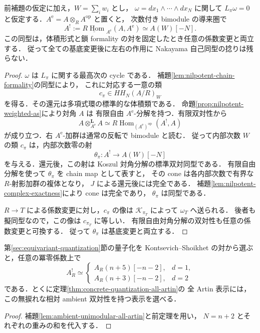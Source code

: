 \begin{theorem}
\label{thm:nilpotent-ambient-cy}
前補題の仮定に加え，$W=\sum_iw_i$ とし，
$\omega=dx_1\wedge\cdots\wedge dx_N$ に関して
$L_\pi\omega=0$ と仮定する．$A^{\mathrm e}=A\otimes_R A^{\mathrm{op}}$ と置くと，
次数付き bimodule の導来圏で
\[
 A^!:=\underline{R\operatorname{Hom}}_{A^{\mathrm e}}(A,A^{\mathrm e})
 \simeq A(W)[-N].
\]
この同型は，体積形式と鎖 formality の対を固定したとき任意の係数変更と両立する．
従って全ての基底変更後に左右の作用に Nakayama 自己同型の捻りは残らない．
\end{theorem}
\begin{proof}
$\omega$ は $L_\pi$ に関する最高次の cycle である．
補題\ref{lem:nilpotent-chain-formality}の同型により，
これに対応する一意の類
\[
 c_\pi\in HH_N(A/R)_W
\]
を得る．その還元は多項式環の標準的な体積類である．
命題\ref{prop:nilpotent-weighted-as}により対角 $A$ は
有限自由 $A^{\mathrm e}$-分解を持つ．有限双対性から
\[
 A\mathbin{\otimes^{\mathbf L}_{A^{\mathrm e}}}A
 \simeq R\operatorname{Hom}_{(A^{\mathrm e})^{\mathrm{op}}}(A^!,A)
\]
が成り立つ．右 $A^{\mathrm e}$-加群は通常の反転で bimodule と読む．
従って内部次数 $W$ の類 $c_\pi$ は，内部次数零の射
\[
 \theta_\pi:A^!\longrightarrow A(W)[-N]
\]
を与える．還元後，この射は Koszul 対角分解の標準双対同型である．
有限自由分解を使って $\theta_\pi$ を chain map として表すと，
その cone は各内部次数で有界な $R$-射影加群の複体となり，
$J$ による還元後には完全である．
補題\ref{lem:nilpotent-complex-exactness}により cone は完全であり，
$\theta_\pi$ は同型である．

$R\to T$ による係数変更に対し，$c_\pi$ の像は
$\mathcal K_{\pi_T}$ によって $\omega_T$ へ送られる．
後者も擬同型なので，この像は $c_{\pi_T}$ に等しい．
有限自由対角分解の双対性も任意の係数変更と可換する．
従って $\theta_\pi$ は基底変更と両立する．
\end{proof}

\begin{corollary}[次数1・2への適用]
\label{cor:dp-ambient-cy}
第\ref{sec:equivariant-quantization}節の量子化を
Kontsevich--Shoikhet の対から選ぶと，任意の冪零係数上で
\[
 A_R^!\simeq
 \begin{cases}
 A_R(n+5)[-n-2],&d=1,\\
 A_R(n+3)[-n-2],&d=2
 \end{cases}
\]
である．とくに定理\ref{thm:concrete-quantization-all-artin}の
全 Artin 表示には，この無捩れな相対 ambient 双対性を持つ表示を選べる．
\end{corollary}
\begin{proof}
補題\ref{lem:ambient-unimodular-all-artin}と前定理を用い，
$N=n+2$ とそれぞれの重みの和を代入する．
\end{proof}

